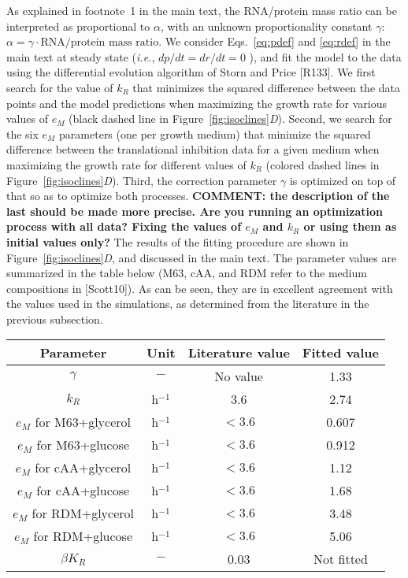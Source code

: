 As explained in footnote~1 in the main text, the RNA/protein mass ratio can be interpreted as proportional to $\alpha$, with an unknown proportionality constant $\gamma$: $\alpha = \gamma \cdot \text{RNA/protein mass ratio}$.
We consider Eqs.~\ref{eq:pdef} and \ref{eq:rdef} in the main text at steady state (\textit{i.e.}, $dp/dt = dr/dt = 0$ ), and fit the model to the data using the differential evolution algorithm of Storn and Price [R133].
We first search for the value of $k_R$ that minimizes the squared difference between the data points and the model predictions when maximizing the growth rate for various values of $e_M$ (black dashed line in Figure~\ref{fig:isoclines}\textit{D}).
Second, we search for the six $e_M$ parameters (one per growth medium) that minimize the squared difference between the translational inhibition data for a given medium when maximizing the growth rate for different values of $k_R$ (colored dashed lines in Figure~\ref{fig:isoclines}\textit{D}).
Third, the correction parameter $\gamma$ is optimized on top of that so as to optimize both processes.
\textbf{COMMENT: the description of the last should be made more precise. Are you running an optimization process with all data? Fixing the values of $e_M$ and $k_R$ or using them as initial values only?}
The results of the fitting procedure are shown in Figure~\ref{fig:isoclines}\textit{D}, and discussed in the main text.
The parameter values are summarized in the table below (M63, cAA, and RDM refer to the medium compositions in [Scott10]).
As can be seen, they are in excellent agreement with the values used in the simulations, as determined from the literature in the previous subsection.

\begin{center}
\begin{tabular}{|c|c|c|c|}
\hline
Parameter & Unit & Literature value & Fitted value \\
\hline
$\gamma$ & $-$ & No value & 1.33\\
\hline
$k_R$ & h$^{-1}$ & 3.6 & 2.74\\
\hline
$e_M$ for M63+glycerol & h$^{-1}$ &  $< 3.6$ & 0.607\\
\hline
$e_M$ for M63+glucose & h$^{-1}$ &  $< 3.6$ & 0.912\\
\hline
$e_M$ for cAA+glycerol & h$^{-1}$ &  $< 3.6$ & 1.12\\
\hline
$e_M$ for cAA+glucose & h$^{-1}$ &  $< 3.6$ & 1.68\\
\hline
$e_M$ for RDM+glycerol & h$^{-1}$ &  $< 3.6$ & 3.48\\
\hline
$e_M$ for RDM+glucose & h$^{-1}$ &  $< 3.6$ & 5.06\\
\hline
$\beta K_R$ & $-$  & 0.03 & Not fitted\\
\hline
\end{tabular}
\end{center}

